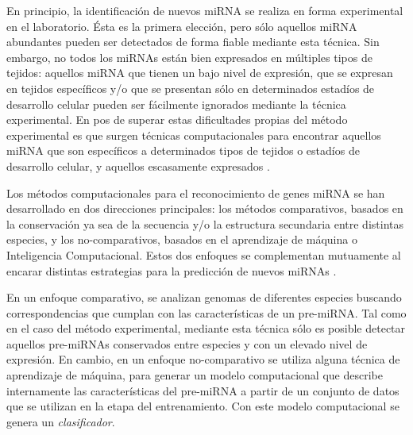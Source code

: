 \documentclass[12pt,bibliography=oldstyle,DIV=12,parskip=full-,titlepage]{scrartcl}
\begin{document}
En principio, la identificación de nuevos miRNA se realiza en forma
experimental en el laboratorio. Ésta es la primera elección, pero sólo
aquellos miRNA abundantes pueden ser detectados de forma fiable
mediante esta técnica. Sin embargo, no todos los miRNAs están bien
expresados en múltiples tipos de tejidos: aquellos miRNA que tienen un
bajo nivel de expresión, que se expresan en tejidos específicos y/o
que se presentan sólo en determinados estadíos de desarrollo celular
pueden ser fácilmente ignorados mediante la técnica
experimental\cite{ding}\cite{xu}.  En pos de superar estas
dificultades propias del método experimental es que surgen técnicas
computacionales para encontrar aquellos miRNA que son específicos a
determinados tipos de tejidos o estadíos de desarrollo celular, y
aquellos escasamente expresados \cite{sheng}\cite{xu}.

Los métodos computacionales para el reconocimiento de genes miRNA se
han desarrollado en dos direcciones principales: los métodos
comparativos, basados en la conservación ya sea de la secuencia y/o la
estructura secundaria entre distintas especies, y los no-comparativos,
basados en el aprendizaje de máquina o Inteligencia
Computacional. Estos dos enfoques se complementan mutuamente al
encarar distintas estrategias para la predicción de nuevos miRNAs
\cite{batuwita}\cite{sheng}.

\newpage
En un enfoque comparativo, se analizan genomas de diferentes especies
buscando correspondencias que cumplan con las características de un
pre-miRNA. Tal como en el caso del método experimental, mediante esta
técnica sólo es posible detectar aquellos pre-miRNAs conservados entre
especies y con un elevado nivel de expresión. En cambio, en un enfoque
no-comparativo se utiliza alguna técnica de aprendizaje de máquina,
para generar un modelo computacional que describe internamente las
características del pre-miRNA a partir de un conjunto de datos que se
utilizan en la etapa del entrenamiento. Con este modelo computacional
se genera un \emph{clasificador}.
\end{document}
